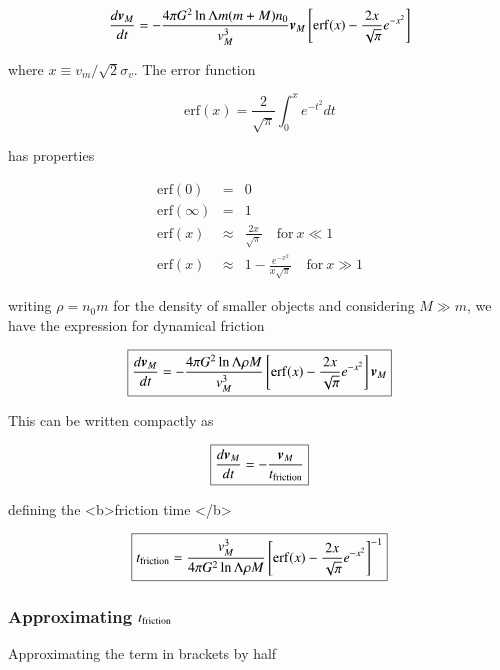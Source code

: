 \begin{equation}
\frac{d{\boldsymbol{v}}_M}{dt} = -\frac{4 \pi G^2 \ln\Lambda m (m+M) n_0}{v_M^3} {\boldsymbol{v}}_M \left[\mathrm{erf}(x) - \frac{2x}{\sqrt{\pi}} e^{-x^2} \right]
\end{equation}


where $x\equiv v_m /\sqrt{2}\sigma_v$. The error function 

\begin{equation}
\mathrm{erf}(x) = \frac{2}{\sqrt{\pi}} \int_0^x e^{-t^2} dt 
\end{equation}

has properties

\begin{eqnarray}
\mathrm{erf}(0) &=& 0 \\
\mathrm{erf}(\infty) &=& 1 \\
\mathrm{erf}(x) &\approx& \frac{2x}{\sqrt{\pi}} \quad \mathrm{for} \ x \ll 1 \\
\mathrm{erf}(x) &\approx& 1 - \frac{e^{-x^2}}{x\sqrt{\pi}} \quad \mathrm{for} \ x \gg 1 
\end{eqnarray}

writing $\rho = n_0 m$ for the density of smaller objects and considering $M \gg m$, we have the expression for dynamical friction

\begin{equation}
\boxed{
\frac{d{\boldsymbol{v}}_M}{dt} = -\frac{4 \pi G^2 \ln\Lambda \rho M }{v_M^3} \left[\mathrm{erf}(x) - \frac{2x}{\sqrt{\pi}} e^{-x^2} \right]{\boldsymbol{v}}_M 
}
\end{equation}

This can be written compactly as 

\begin{equation}
\boxed{
\frac{d{\boldsymbol{v}}_M}{dt} = -\frac{{\boldsymbol{v}}_M}{t_{\rm friction}}
}
\end{equation}

defining the <b>friction time </b>

\begin{equation}
\boxed{
t_{\rm friction} = \frac{v_M^3}{4 \pi G^2 \ln\Lambda \rho M } \left[\mathrm{erf}(x) - \frac{2x}{\sqrt{\pi}} e^{-x^2} \right]^{-1}
}
\end{equation}


\subsubsection{Approximating $t_{\rm friction}$}

Approximating the term in brackets by half 

